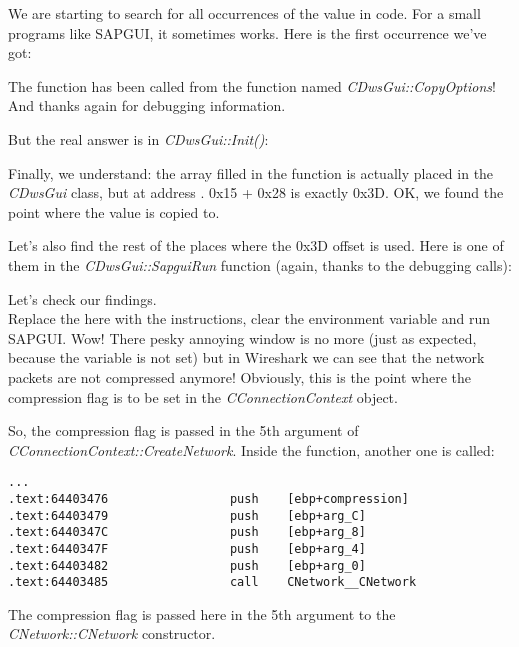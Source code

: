 We are starting to search for all occurrences of the  value in code. 
For a small programs like SAPGUI, it sometimes works. Here is the first occurrence we've got:



The function has been called from the function named \emph{CDwsGui::CopyOptions}! And thanks again for debugging information.

But the real answer is in \emph{CDwsGui::Init()}:



Finally, we understand: the array filled in the  function is actually placed in the \emph{CDwsGui} class, 
but at address . 0x15 + 0x28 is exactly 0x3D. OK, we found the point where the value is copied to.

Let's also find the rest of the places where the 0x3D offset is used. 
Here is one of them in the \emph{CDwsGui::SapguiRun} function (again, thanks to the debugging calls):



Let's check our findings. \\
Replace the  here with the  instructions,
clear the \TDWNC 
environment variable and run SAPGUI. Wow! There pesky annoying window is no more (just as expected, 
because the variable is not set) but in Wireshark we can see that the network packets are not compressed anymore! 
Obviously, this is the point where the compression flag is to be set in the \emph{CConnectionContext} object.

So, the compression flag is passed in the 5th argument of \emph{CConnectionContext::CreateNetwork}. 
Inside the function, another one is called:

\begin{lstlisting}[style=customasmx86]
...
.text:64403476                 push    [ebp+compression]
.text:64403479                 push    [ebp+arg_C]
.text:6440347C                 push    [ebp+arg_8]
.text:6440347F                 push    [ebp+arg_4]
.text:64403482                 push    [ebp+arg_0]
.text:64403485                 call    CNetwork__CNetwork
\end{lstlisting}

The compression flag is passed here in the 5th argument to the \emph{CNetwork::CNetwork} constructor.

